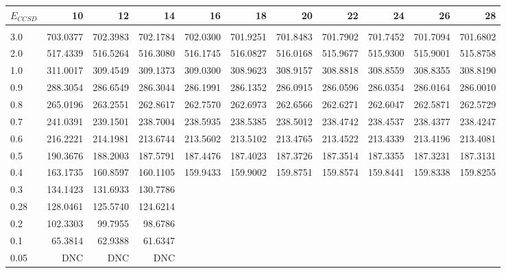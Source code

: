 \begin{landscape}
\begin{table}
\begin{center}
\begin{tabular}{l|rrrrrrrrrr}
\hline 
$E_{CCSD}$ & 10 & 12 & 14 & 16 & 18 & 20 & 22 & 24 & 26 & 28 \\
\hline \hline\\
3.0 & 703.0377 & 702.3983 & 702.1784 & 702.0300 & 701.9251 & 701.8483 & 701.7902 & 701.7452 & 701.7094 & 701.6802 \\ 
2.0 & 517.4339 & 516.5264 & 516.3080 & 516.1745 & 516.0827 & 516.0168 & 515.9677 & 515.9300 & 515.9001 & 515.8758 \\ 
1.0 & 311.0017 & 309.4549 & 309.1373 & 309.0300 & 308.9623 & 308.9157 & 308.8818 & 308.8559 & 308.8355 & 308.8190 \\ 
0.9 & 288.3054 & 286.6549 & 286.3044 & 286.1991 & 286.1352 & 286.0915 & 286.0596 & 286.0354 & 286.0164 & 286.0010 \\ 
0.8 & 265.0196 & 263.2551 & 262.8617 & 262.7570 & 262.6973 & 262.6566 & 262.6271 & 262.6047 & 262.5871 & 262.5729 \\ 
0.7 & 241.0391 & 239.1501 & 238.7004 & 238.5935 & 238.5385 & 238.5012 & 238.4742 & 238.4537 & 238.4377 & 238.4247 \\ 
0.6 & 216.2221 & 214.1981 & 213.6744 & 213.5602 & 213.5102 & 213.4765 & 213.4522 & 213.4339 & 213.4196 & 213.4081 \\ 
0.5 & 190.3676 & 188.2003 & 187.5791 & 187.4476 & 187.4023 & 187.3726 & 187.3514 & 187.3355 & 187.3231 & 187.3131 \\ 
0.4 & 163.1735 & 160.8597 & 160.1105 & 159.9433 & 159.9002 & 159.8751 & 159.8574 & 159.8441 & 159.8338 & 159.8255 \\ 
0.3 & 134.1423 & 131.6933 & 130.7786 &  \\ 
0.28 & 128.0461 & 125.5740 & 124.6214  \\ 
0.2 & 102.3303 & 99.7955 & 98.6786  \\ 
0.1 & 65.3814 & 62.9388 & 61.6347  \\ 
0.05 & DNC & DNC & DNC  \\ 
\hline \hline
\end{tabular}
\end{center}
\end{table}
\end{landscape}


